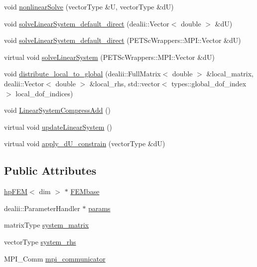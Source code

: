 \begin{DoxyCompactItemize}
\item 
void \hyperlink{classsolve_class_a9240f8777a918e2c20e57857e4b6b97e}{nonlinear\-Solve} (vector\-Type \&U, vector\-Type \&d\-U)
\item 
void \hyperlink{classsolve_class_aaed39c6902f1e1de684583e56fb14f66}{solve\-Linear\-System\-\_\-default\-\_\-direct} (dealii\-::\-Vector$<$ double $>$ \&d\-U)
\item 
void \hyperlink{classsolve_class_ac888eaa37061db46d24d90065b733a82}{solve\-Linear\-System\-\_\-default\-\_\-direct} (P\-E\-T\-Sc\-Wrappers\-::\-M\-P\-I\-::\-Vector \&d\-U)
\item 
virtual void \hyperlink{classsolve_class_a31c22340527a596f8d6aeeea60ffe52a}{solve\-Linear\-System} (P\-E\-T\-Sc\-Wrappers\-::\-M\-P\-I\-::\-Vector \&d\-U)
\item 
void \hyperlink{classsolve_class_af9e8a3e1a38280c43f242bbeb7139f00}{distribute\-\_\-local\-\_\-to\-\_\-global} (dealii\-::\-Full\-Matrix$<$ double $>$ \&local\-\_\-matrix, dealii\-::\-Vector$<$ double $>$ \&local\-\_\-rhs, std\-::vector$<$ types\-::global\-\_\-dof\-\_\-index $>$ local\-\_\-dof\-\_\-indices)
\item 
void \hyperlink{classsolve_class_ad7659997bee5e782a6eaa46db001b66a}{Linear\-System\-Compress\-Add} ()
\item 
virtual void \hyperlink{classsolve_class_af78c2c6284234c93872188334fb997d8}{update\-Linear\-System} ()
\item 
virtual void \hyperlink{classsolve_class_a029ece57f667fa697cb29eb482eff31b}{apply\-\_\-d\-U\-\_\-constrain} (vector\-Type \&d\-U)
\end{DoxyCompactItemize}
\subsection*{Public Attributes}
\begin{DoxyCompactItemize}
\item 
\hyperlink{classhp_f_e_m}{hp\-F\-E\-M}$<$ dim $>$ $\ast$ \hyperlink{classsolve_class_a46118a342b07ce7167bb0c9358de84f1}{F\-E\-Mbase}
\item 
dealii\-::\-Parameter\-Handler $\ast$ \hyperlink{classsolve_class_accca5aede13ea52f0c11dff4daf1ad97}{params}
\item 
matrix\-Type \hyperlink{classsolve_class_a56f7357eb335f9ce4ac30bc30d7513e8}{system\-\_\-matrix}
\item 
vector\-Type \hyperlink{classsolve_class_a6c39fa839fdc40d2408946617a778571}{system\-\_\-rhs}
\item 
M\-P\-I\-\_\-\-Comm \hyperlink{classsolve_class_a03728ed636ca889ae407c84d181bc611}{mpi\-\_\-communicator}
\end{DoxyCompactItemize}


